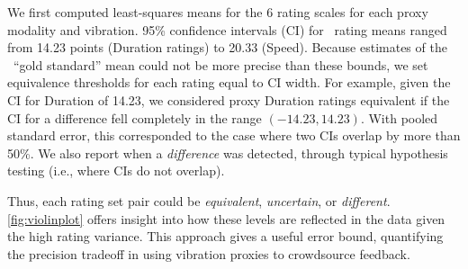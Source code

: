 %
%
% 
We first computed least-squares means for the 6 rating scales
for each proxy modality and vibration.
95\% confidence intervals (CI) for \hifi~rating means ranged from 14.23 points (Duration ratings) to 20.33 (Speed).
Because estimates of the \hifi~``gold standard'' mean could not be more precise than these bounds, we set equivalence thresholds for each rating equal to CI width.
For example, given the CI for Duration of 14.23, we considered proxy Duration ratings equivalent if the CI for a difference fell completely in the range $(-14.23, 14.23)$.
With pooled standard error, this corresponded to the case where two CIs overlap by more than 50\%.
%
We also report when a \textit{difference} was detected, through typical hypothesis testing (i.e., where CIs do not overlap).

Thus, each rating set pair could be \textit{equivalent}, \textit{uncertain}, or \textit{different}.
\autoref{fig:violinplot} offers insight into how these  levels are reflected in the data given the high rating variance.
This approach gives a useful error bound, quantifying the precision tradeoff in using vibration proxies  to crowdsource feedback.


